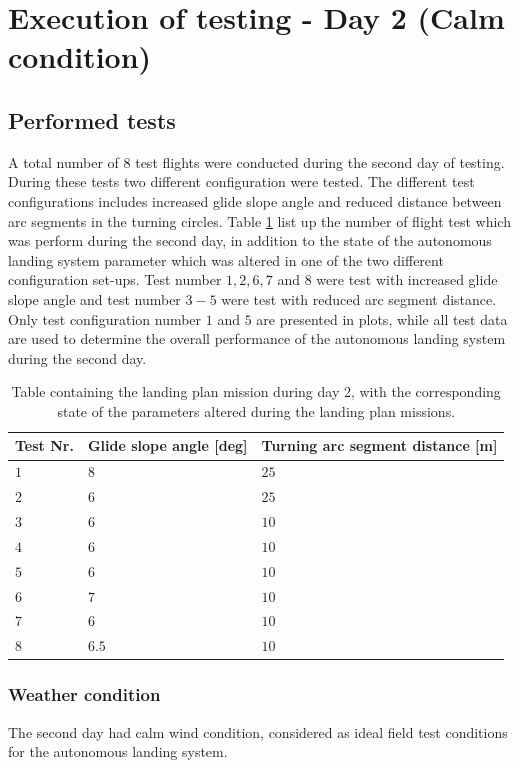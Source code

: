 \section{Execution of testing - Day 2 (Calm condition)}
\subsection{Performed tests}
A total number of 8 test flights were conducted during the second day of testing. During these tests two different configuration were tested. The different test configurations includes increased glide slope angle and reduced distance between arc segments in the turning circles. Table \ref{tb:Day2ParameterAlteration} list up the number of flight test which was perform during the second day, in addition to the state of the autonomous landing system parameter which was altered in one of the two different configuration set-ups. Test number $1,2,6,7$ and $8$ were test with increased glide slope angle and test number $3-5$ were test with reduced arc segment distance. Only test configuration number $1$ and $5$ are presented in plots, while all test data are used to determine the overall performance of the autonomous landing system during the second day.
\begin{table}[H]
\centering
\begin{tabular}{| p{0.5cm} | p{3cm} | p{4cm} |}
\hline
\textbf{Test Nr.} & \textbf{Glide slope angle [deg]} &  \textbf{Turning arc segment distance [m]}\\ \hline
$1$				& $8$ & $ 25 $		\\ \hline
$2$				& $6$ & $ 25 $		\\ \hline
$3$				& $6$ & $ 10 $		\\ \hline
$4$				& $6$ & $ 10 $		\\ \hline
$5$				& $6$ & $ 10 $			\\ \hline
$6$				& $7$ & $ 10 $		\\ \hline
$7$				& $6$ & $ 10 $			\\ \hline
$8$				& $6.5$ & $ 10 $	\\ \hline
\end{tabular}
\caption{Table containing the landing plan mission during day 2, with the corresponding state of the parameters altered during the landing plan missions.}
\label{tb:Day2ParameterAlteration}
\end{table}
\subsubsection{Weather condition}
The second day had calm wind condition, considered as ideal field test conditions for the autonomous landing system.
